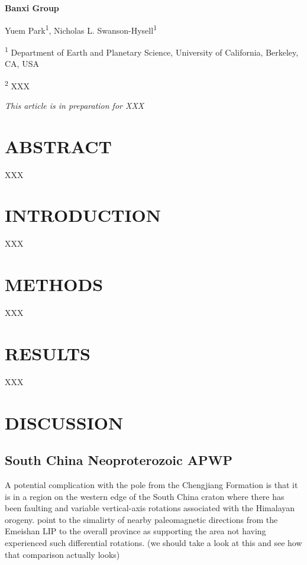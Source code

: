 \documentclass[11pt,letterpaper]{article}
\begin{document}
\begin{flushleft}
{\Large \textbf{Banxi Group}}

Yuem Park\textsuperscript{1},
Nicholas L. Swanson-Hysell\textsuperscript{1}

\bigskip
\textsuperscript{1} Department of Earth and Planetary Science, University of California, Berkeley, CA, USA

\textsuperscript{2} XXX
\bigskip

\end{flushleft}

\noindent\textit{This article is in preparation for XXX}

\linenumbers

\section*{ABSTRACT \label{sec:ABSTRACT}}

XXX

\section*{INTRODUCTION \label{sec:INTRODUCTION}}

XXX

\section*{METHODS}

XXX

\section*{RESULTS}

XXX

\section*{DISCUSSION}

\subsection*{South China Neoproterozoic APWP}

A potential complication with the pole from the Chengjiang Formation is that it is in a region on the western edge of the South China craton where there has been faulting and variable vertical-axis rotations associated with the Himalayan orogeny. \cite{Jing2019} point to the simalirty of nearby paleomagnetic directions from the Emeishan LIP to the overall province as supporting the area not having experienced such differential rotations. (we should take a look at this and see how that comparison actually looks)
\end{document}
